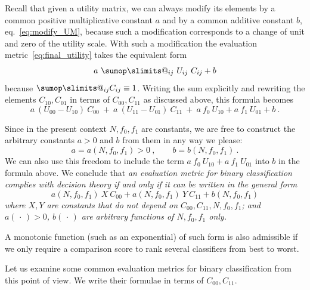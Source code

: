 \documentclass[\ifafour a4paper,12pt,\else a5paper,10pt,\fi%
onecolumn,oneside,article,%
british%
]{memoir}
\makeatletter
\theoremstyle{remark}
\theoremstyle{innote}
\def\sum{\DOTSI\sumop\slimits@}
\newcommand*{\dotv}{\mathord{\,\cdot\,}}%
\renewcommand*{\|}[1][]{\nonscript\:#1\vert\nonscript\:\mathopen{}}
\newcommand*{\eqn}{eq.}%
\newcommand*{\cx}{X}
\newcommand*{\cy}{Y}
\makeatother
\begin{document}
Recall that given a utility matrix, we can always modify its elements by a common positive multiplicative constant $a$ and by a common additive constant $b$, \eqn~\eqref{eq:modify_UM}, because such a modification corresponds to a change of unit and zero of the utility scale. With such a modification the evaluation metric~\eqref{eq:final_utility} takes the equivalent form
\begin{equation}
  \label{eq:final_utility_modified}
 a\ \sum_{ij} \ U_{ij}\ C_{ij} + b
\end{equation}
because $\sum_{ij} C_{ij} \equiv 1$. Writing the sum explicitly and rewriting the elements $C_{10}, C_{01}$ in terms of $C_{00}, C_{11}$ as discussed above, this formula becomes 
\begin{equation}
  \label{eq:final_utility_binary}
    a\ (U_{00} - U_{10})\ C_{00} \ + \ 
    a\ (U_{11} - U_{01})\ C_{11} \ + \ 
    a\ f_{0}\ U_{10} + a\ f_{1}\ U_{01} +  b \ .
\end{equation}

Since in the present context $N, f_{0}, f_{1}$ are constants, we are free to construct the arbitrary constants $a > 0$ and $b$ from them in any way we please:
\begin{equation}
  \label{eq:constants_functions}
  a = a(N, f_{0}, f_{1}) > 0\ , \qquad
  b = b(N, f_{0}, f_{1}) \ .
\end{equation}
We can also use this freedom to include the term $a\ f_{0}\ U_{10} + a\ f_{1}\ U_{01}$ into $b$ in the formula above. We conclude that \emph{an evaluation metric for binary classification complies with decision theory if and only if it can be written in the general form}
\begin{equation}
  \label{eq:general_valuation_metric}
  a(N, f_{0}, f_{1})\ \cx\ C_{00} +
  a(N, f_{0}, f_{1})\ \cy\  C_{11} +
  b(N, f_{0}, f_{1})
\end{equation}
\emph{where $\cx,\cy$ are constants that do not depend on $C_{00}, C_{11}, N, f_{0}, f_{1}$; and $a(\dotv)>0$, $b(\dotv)$ are arbitrary functions of $N, f_{0}, f_{1}$ only.}

A monotonic function (such as an exponential) of such form is also admissible if we only require a comparison score to rank several classifiers from best to worst.

Let us examine some common evaluation metrics for binary classification from this point of view. We write their formulae in terms of $C_{00}, C_{11}$.
\end{document}
